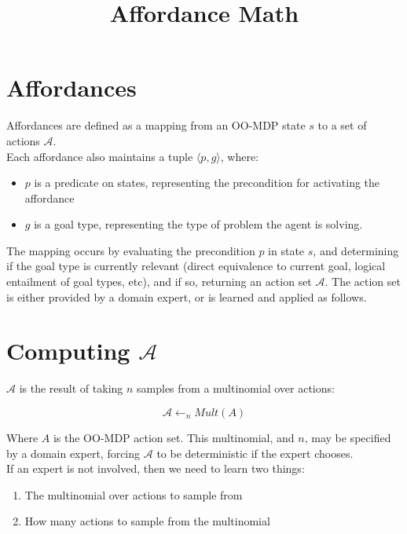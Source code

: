 \documentclass[11pt]{article}
\title{Affordance Math}
\date{}
\begin{document}
\maketitle

\section{Affordances}
Affordances are defined as a mapping from an OO-MDP state $s$ to a set of actions $\mathcal{A}$. \\

Each affordance also maintains a tuple $\langle p, g \rangle$, where:

\begin{itemize}
\item $p$ is a predicate on states, representing the precondition for activating the affordance
\item $g$ is a goal type, representing the type of problem the agent is solving.
\end{itemize}

The mapping occurs by evaluating the precondition $p$ in state $s$, and determining if the goal type
is currently relevant (direct equivalence to current goal, logical entailment of goal types, etc), and if so,
returning an action set $\mathcal{A}$. The action set is either provided by a domain expert, or is learned and applied as follows. \\

\section{Computing $\mathcal{A}$}
$\mathcal{A}$ is the result of taking $n$ samples from a multinomial over actions:

\begin{equation}
\mathcal{A} \leftarrow_n Mult(A)
\end{equation}

Where $A$ is the OO-MDP action set. This multinomial, and $n$, may be specified by a domain expert, forcing $\mathcal{A}$ to be deterministic if the expert chooses. \\

If an expert is not involved, then we need to learn two things:
\begin{enumerate}
\item The multinomial over actions to sample from
\item How many actions to sample from the multinomial
\end{enumerate}
\end{document}

